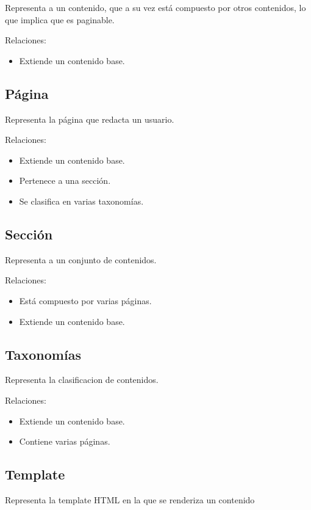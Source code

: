 Representa a un contenido, que a su vez está compuesto por otros contenidos, lo que implica
que es paginable.

Relaciones:
\begin{itemize}
    \item Extiende un contenido base.
\end{itemize}

\subsection{Página}

Representa la página que redacta un usuario.

Relaciones:
\begin{itemize}
    \item Extiende un contenido base.
    \item Pertenece a una sección.
    \item Se clasifica en varias taxonomías.
\end{itemize}

\subsection{Sección}

Representa a un conjunto de contenidos.

Relaciones:
\begin{itemize}
    \item Está compuesto por varias páginas.
    \item Extiende un contenido base.
\end{itemize}

\subsection{Taxonomías}

Representa la clasificacion de contenidos.

Relaciones:
\begin{itemize}
    \item Extiende un contenido base.
    \item Contiene varias páginas.
\end{itemize}

\subsection{Template}

Representa la template HTML en la que se renderiza un contenido

